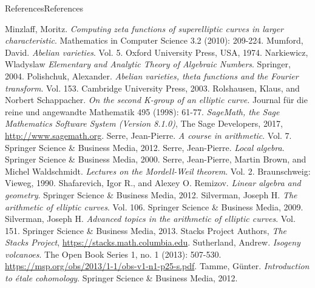 \documentclass[10pt,]{book}
\numberwithin{equation}{section}
\begin{document}
\begin{references-chapter-numberless}{References}{}{References}{}{}
\begin{thebibliography}{9}
\hypertarget{bib-minzlaff}{}Minzlaff, Moritz. \textit{Computing zeta functions of superelliptic curves in larger characteristic}. Mathematics in Computer Science 3.2 (2010): 209-224.
\hypertarget{bib-mumford-abvar}{}Mumford, David. \textit{Abelian varieties}. Vol. 5. Oxford University Press, USA, 1974.
\hypertarget{bib-narkiewicz}{}Narkiewicz, Wladyslaw  \textit{Elementary and Analytic Theory of Algebraic Numbers}. Springer, 2004.
\hypertarget{bib-polishchuck}{}Polishchuk, Alexander. \textit{Abelian varieties, theta functions and the Fourier transform}. Vol. 153. Cambridge University Press, 2003.
\hypertarget{bib-rolshausen}{}Rolshausen, Klaus, and Norbert Schappacher.  \textit{On the second K-group of an elliptic curve.}  Journal für die reine und angewandte Mathematik 495 (1998): 61-77.
\hypertarget{bib-sage}{}\textit{SageMath, the Sage Mathematics Software System (Version 8.1.0)}, The Sage Developers, 2017, \url{http://www.sagemath.org}.
\hypertarget{bib-serre-course}{}Serre, Jean-Pierre. \textit{A course in arithmetic}. Vol. 7. Springer Science \& Business Media, 2012.
\hypertarget{bib-serre-local-alg}{}Serre, Jean-Pierre. \textit{Local algebra}. Springer Science \& Business Media, 2000.
\hypertarget{bib-serre-mordell-weil}{}Serre, Jean-Pierre, Martin Brown, and Michel Waldschmidt. \textit{Lectures on the Mordell-Weil theorem}. Vol. 2. Braunschweig: Vieweg, 1990.
\hypertarget{bib-shafarevich-remizov}{}Shafarevich, Igor R., and Alexey O. Remizov. \textit{Linear algebra and geometry}. Springer Science \& Business Media, 2012.
\hypertarget{bib-silverman}{}Silverman, Joseph H. \textit{The arithmetic of elliptic curves}. Vol. 106. Springer Science \& Business Media, 2009.
\hypertarget{bib-silverman-advanced}{}Silverman, Joseph H. \textit{Advanced topics in the arithmetic of elliptic curves}. Vol. 151. Springer Science \& Business Media, 2013.
\hypertarget{bib-stacks}{}Stacks Project Authors, \textit{The Stacks Project}, \url{https://stacks.math.columbia.edu}.
\hypertarget{bib-sutherland}{}Sutherland, Andrew. \textit{Isogeny volcanoes}. The Open Book Series 1, no. 1 (2013): 507-530. \url{https://msp.org/obs/2013/1-1/obs-v1-n1-p25-s.pdf}.
\hypertarget{bib-tamme}{}Tamme, Günter. \textit{Introduction to étale cohomology}. Springer Science \& Business Media, 2012.

\end{thebibliography}
\end{references-chapter-numberless}
\end{document}
